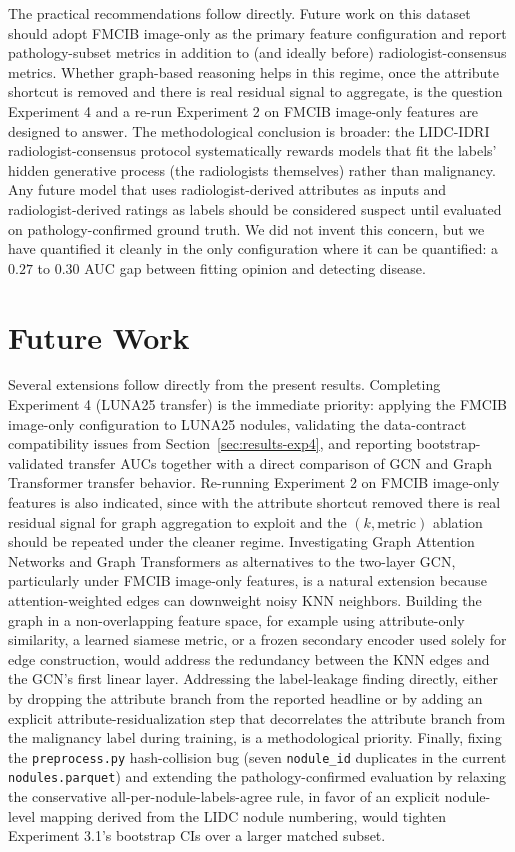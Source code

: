 \documentclass[10pt,letterpaper,twocolumn]{article}
\begin{document}
The practical recommendations follow directly. Future work on this dataset should adopt FMCIB image-only as the primary feature configuration and report pathology-subset metrics in addition to (and ideally before) radiologist-consensus metrics. Whether graph-based reasoning helps in this regime, once the attribute shortcut is removed and there is real residual signal to aggregate, is the question Experiment 4 and a re-run Experiment 2 on FMCIB image-only features are designed to answer. The methodological conclusion is broader: the LIDC-IDRI radiologist-consensus protocol systematically rewards models that fit the labels' hidden generative process (the radiologists themselves) rather than malignancy. Any future model that uses radiologist-derived attributes as inputs and radiologist-derived ratings as labels should be considered suspect until evaluated on pathology-confirmed ground truth. We did not invent this concern, but we have quantified it cleanly in the only configuration where it can be quantified: a $0.27$ to $0.30$ AUC gap between fitting opinion and detecting disease.

\section{Future Work}
\label{sec:future}

Several extensions follow directly from the present results. Completing Experiment 4 (LUNA25 transfer) is the immediate priority: applying the FMCIB image-only configuration to LUNA25 nodules, validating the data-contract compatibility issues from Section~\ref{sec:results-exp4}, and reporting bootstrap-validated transfer AUCs together with a direct comparison of GCN and Graph Transformer transfer behavior. Re-running Experiment 2 on FMCIB image-only features is also indicated, since with the attribute shortcut removed there is real residual signal for graph aggregation to exploit and the $(k, \text{metric})$ ablation should be repeated under the cleaner regime. Investigating Graph Attention Networks and Graph Transformers as alternatives to the two-layer GCN, particularly under FMCIB image-only features, is a natural extension because attention-weighted edges can downweight noisy KNN neighbors. Building the graph in a non-overlapping feature space, for example using attribute-only similarity, a learned siamese metric, or a frozen secondary encoder used solely for edge construction, would address the redundancy between the KNN edges and the GCN's first linear layer. Addressing the label-leakage finding directly, either by dropping the attribute branch from the reported headline or by adding an explicit attribute-residualization step that decorrelates the attribute branch from the malignancy label during training, is a methodological priority. Finally, fixing the \texttt{preprocess.py} hash-collision bug (seven \texttt{nodule\_id} duplicates in the current \texttt{nodules.parquet}) and extending the pathology-confirmed evaluation by relaxing the conservative all-per-nodule-labels-agree rule, in favor of an explicit nodule-level mapping derived from the LIDC nodule numbering, would tighten Experiment 3.1's bootstrap CIs over a larger matched subset.
\end{document}
